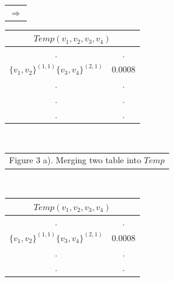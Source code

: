 \documentclass[11pt]{article}
\begin{document}
\begin{table}[!htb]
\begin{minipage}{.06\linewidth}
        \begin{tabular}{c}
     $ \Rightarrow$\\
        \end{tabular}
    \end{minipage}%
     \begin{minipage}{.3\linewidth}
      \centering
     \begin{tabular}{cc}
\multicolumn{2}{c}{$Temp(v_1,v_2,v_3,v_4)$}                           \\ \hline
\multicolumn{1}{|c}{.} & \multicolumn{1}{|c|}{.} \\ \hline
  \multicolumn{1}{|l}{$\{v_1,v_2\}^{(1,1)}\{v_3,v_4\}^{(2,1)}$} & \multicolumn{1}{|l|}{$0.0008$} \\ \hline         
                   \multicolumn{1}{|c}{.} & \multicolumn{1}{|c|}{.} \\ \hline                 
                   \multicolumn{1}{|c}{.} & \multicolumn{1}{|c|}{.} \\ \hline
                   \multicolumn{1}{|c}{.} & \multicolumn{1}{|c|}{.} \\ \hline        
\end{tabular}
    \end{minipage}\\
    \begin{minipage}{1.0\linewidth}
       \centering
        \begin{tabular}{c}
Figure 3 a). Merging two table into $Temp$
        \end{tabular}
    \end{minipage}\\
     \begin{minipage}{.4\linewidth}
      \centering
     \begin{tabular}{cc}
\multicolumn{2}{c}{$Temp(v_1,v_2,v_3,v_4)$}                           \\ \hline
\multicolumn{1}{|c}{.} & \multicolumn{1}{|c|}{.} \\ \hline
  \multicolumn{1}{|l}{$\{v_1,v_2\}^{(1,1)}\{v_3,v_4\}^{(2,1)}$} & \multicolumn{1}{|l|}{$0.0008$} \\ \hline         
                   \multicolumn{1}{|c}{.} & \multicolumn{1}{|c|}{.} \\ \hline                 
                   \multicolumn{1}{|c}{.} & \multicolumn{1}{|c|}{.} \\ \hline

\end{tabular}
\end{minipage}
\end{table}
\end{document}
